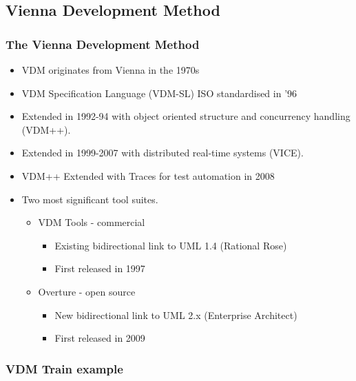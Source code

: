 \subsection{Vienna Development Method}
%
%
\frame
{
  \frametitle{The Vienna Development Method}


  \begin{itemize}
  		\item<1-> VDM originates from Vienna in the 1970s
  		\item<2-> VDM Specification Language (VDM-SL) ISO standardised in '96
  		\item<3-> Extended in 1992-94 with object oriented structure and concurrency handling (VDM++).
  		\item<4-> Extended in 1999-2007 with distributed real-time systems (VICE).
	  	\item<5-> VDM++ Extended with Traces for test automation in 2008
  		\item<5-> Two most significant tool suites.
  		\begin{itemize}
  			\item VDM Tools - commercial
			\begin{itemize}
				\item Existing bidirectional link to UML 1.4 (Rational Rose)
				\item First released in 1997
			\end{itemize}
  			\item Overture - open source
			\begin{itemize}
				\item New bidirectional link to UML 2.x (Enterprise Architect)
				\item First released in 2009
			\end{itemize}
  		\end{itemize}

  \end{itemize}


}

%
%
\frame
{
  \frametitle{VDM Train example}

\begin{center}


\end{center}
}

